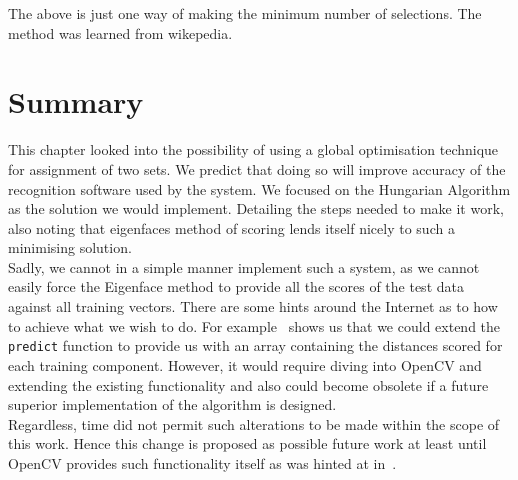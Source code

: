 The above is just one way of making the minimum number of selections.  The method was learned from 
wikepedia.

\section{Summary}
This chapter looked into the possibility of using a global optimisation technique for assignment of 
two sets.  We predict that doing so will improve accuracy of the recognition software used by the system.  
We focused on the Hungarian Algorithm as the solution we would implement.  Detailing the steps needed to make it 
work, also noting that eigenfaces method of scoring lends itself nicely to such a minimising solution. \\

Sadly, we cannot in a simple manner implement such a system, as we cannot easily force the Eigenface method to 
provide all the scores of the test data against all training vectors.  There are some hints around the Internet 
as to how to achieve what we wish to do.  For example~\cite{Eigenface_classification} shows us that we could 
extend the \texttt{predict} function to provide us with an array containing the distances scored for each 
training component.  However, it would require diving into OpenCV and extending the existing functionality 
and also could become obsolete if a future superior implementation of the algorithm is designed.  \\

Regardless, time did not permit such alterations to be made within the scope of this work.  Hence this change 
is proposed as possible future work at least until OpenCV provides such functionality itself as was hinted at 
in~\cite{Eigenface_classification}. \\


